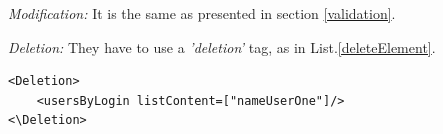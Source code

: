 	
	\vspace{0.15em}
	\noindent\textit{Modification:} It is the same as presented in section \ref{validation}.
	
	\vspace{0.15em}
	\noindent\textit{Deletion:} They have to use a \textit{'deletion'} tag, as in List.\ref{deleteElement}.
	\lstset{
  								caption=Deletion of a user with the 'Deletion' tag, 
  								label=deleteElement,
 								basicstyle=\scriptsize,
  								xleftmargin=.22\columnwidth , xrightmargin=.22\columnwidth
						}
	\begin{lstlisting}
<Deletion>
	<usersByLogin listContent=["nameUserOne"]/>
<\Deletion>
	\end{lstlisting}
	
	